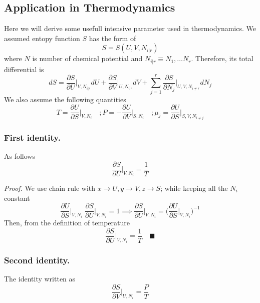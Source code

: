 \documentclass[../../../Main.tex]{subfiles}
\begin{document}
\subsection*{Application in Thermodynamics}
Here we will derive some usefull intensive parameter used in thermodynamics. We assumed entopy function $S$ has the form of 
\begin{equation*}
    S=S(U, V, N_{i|r} )
\end{equation*}
where $N$ is number of chemical potential and $N_{i|r}\equiv N_1,\dots N_r$. Therefore, its total differential is 
\begin{equation*}
    dS=\frac{\partial S}{\partial U}\bigg|_{V, N_{i|r} }dU + \frac{\partial S}{ \partial V}\bigg|_{U, N_{i|r} }dV +\sum_{j=1}^{r}\frac{\partial S}{ \partial N_j}\bigg|_{U,V, N_{i\neq r} }dN_j
\end{equation*}
We also assume the following quantities
\begin{equation*}
    T=\frac{\partial U}{\partial S}\bigg|_{V, N_{i} }\quad
    ;P=-\frac{\partial U}{\partial V}\bigg|_{S, N_{i} }\quad
    ;\mu_j=\frac{\partial U}{\partial S}\bigg|_{S, V, N_{i\neq j} }
\end{equation*}

\subsubsection*{First identity.} As follows
\begin{equation*}
    \frac{\partial S}{\partial U}\bigg|_{V, N_i}=\frac{1}{T}
\end{equation*}

\emph{Proof.} We use chain rule with $x\rightarrow U,  y \rightarrow V ,z \rightarrow S$; while keeping all the $N_i$ constant
\begin{equation*}
    \frac{\partial U}{\partial S}\bigg|_{V,N_i}\;\frac{\partial S}{\partial U}\bigg|_{V,N_i}=1\implies
    \frac{\partial S}{\partial U}\bigg|_{V,N_i}=\biggl(\frac{\partial U}{\partial S}\bigg|_{V,N_i}\biggr)^{-1}
\end{equation*}
Then, from the definition of temperature
\begin{equation*}
    \frac{\partial S}{\partial U}\bigg|_{V,N_i}=\frac{1}{T}\quad \blacksquare
\end{equation*}

\subsubsection*{Second identity.} The identity written as
\begin{equation*}
    \frac{\partial S}{\partial V}\bigg|_{U, N_i}=\frac{P}{T}
\end{equation*}
\end{document}
